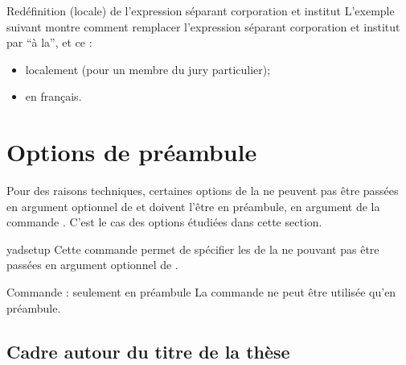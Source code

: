 \begin{dbexample}{Redéfinition (locale) de l'expression séparant corporation et
    institut}{}
  L'exemple suivant montre comment remplacer l'expression séparant corporation
  et institut par \enquote{\textvisiblespace{}à la\textvisiblespace{}}, et ce :
  \begin{itemize}
  \item localement (pour un membre du jury particulier);
  \item en français.
  \end{itemize}
\begin{bodycode}[listing options={showspaces}]
\end{bodycode}
\end{dbexample}

\section{Options de préambule}
\label{sec:options-de-preambule}

Pour des raisons techniques, certaines options de la \yatcl ne peuvent pas être
passées en argument optionnel de  et doivent
l'être en préambule, en argument de la commande .  C'est le
cas des options étudiées dans cette section.

\begin{docCommand}{yadsetup}{}
  Cette commande permet de spécifier les  de la \yatcl ne pouvant
  pas être passées en argument optionnel de .
\end{docCommand}

\begin{dbwarning}{Commande \protect{} : seulement en préambule}{}
  La commande  ne peut être utilisée qu'en préambule.
\end{dbwarning}


\subsection{Cadre autour du titre de la thèse}
\label{sec:cadre-autour-du}

